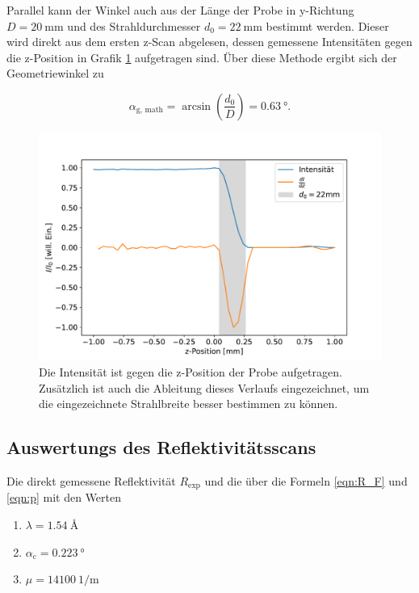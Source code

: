     \FloatBarrier

    Parallel kann der Winkel auch aus der Länge der Probe in y-Richtung $D=\SI{20}{\milli\metre}$ und des Strahldurchmesser $d_0=\SI{22}{\milli\metre}$ bestimmt werden. Dieser wird direkt aus dem ersten z-Scan 
    abgelesen, dessen gemessene Intensitäten gegen die z-Position in Grafik \ref{fig:zscan} aufgetragen sind. Über diese Methode ergibt sich der Geometriewinkel zu

    \begin{equation*}
      \alpha_{\text{g, math}} = \arcsin\left(\frac{d_0}{D}\right) = \SI{0.63}{\degree}.
    \end{equation*}

    \FloatBarrier
    \begin{figure}[h]
        \centering
        \includegraphics[width = \textwidth]{abschattung.pdf}
        \caption{Die Intensität ist gegen die z-Position der Probe aufgetragen. Zusätzlich ist auch die Ableitung dieses Verlaufs eingezeichnet, um die eingezeichnete Strahlbreite besser bestimmen zu können.}
        \label{fig:zscan}
      \end{figure}
  
    \FloatBarrier


  \subsection{Auswertungs des Reflektivitätsscans}
    Die direkt gemessene Reflektivität $R_{\text{exp}}$ und die über die Formeln \ref{eqn:R_F} und \ref{eqn:p} mit den Werten

    \begin{enumerate}
      \item $\lambda = \SI{1.54}{\angstrom}$
      \item $\alpha_{\text{c}} = \SI{0.223}{\degree}$
      \item $\mu = \SI{14100}{1\per\metre}$
    \end{enumerate}

